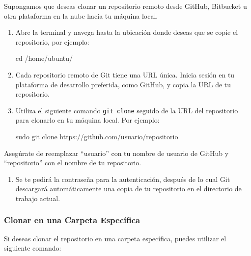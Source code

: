 \documentclass[
  letterpaper,
  DIV=11,
  numbers=noendperiod]{scrartcl}
\newenvironment{Shaded}{}{}
\newcommand{\BuiltInTok}[1]{\textcolor[rgb]{0.84,0.23,0.29}{#1}}
\newcommand{\FunctionTok}[1]{\textcolor[rgb]{0.44,0.26,0.76}{#1}}
\newcommand{\NormalTok}[1]{\textcolor[rgb]{0.14,0.16,0.18}{#1}}
\providecommand{\tightlist}{%
  \setlength{\itemsep}{0pt}\setlength{\parskip}{0pt}}\usepackage{longtable,booktabs,array}
\begin{document}
Supongamos que deseas clonar un repositorio remoto desde GitHub,
Bitbucket u otra plataforma en la nube hacia tu máquina local.

\begin{enumerate}
\def\labelenumi{\arabic{enumi}.}
\item
  Abre la terminal y navega hasta la ubicación donde deseas que se copie
  el repositorio, por ejemplo:

\begin{Shaded}
\begin{Highlighting}[]
\BuiltInTok{cd}\NormalTok{ /home/ubuntu/}
\end{Highlighting}
\end{Shaded}
\item
  Cada repositorio remoto de Git tiene una URL única. Inicia sesión en
  tu plataforma de desarrollo preferida, como GitHub, y copia la URL de
  tu repositorio.
\item
  Utiliza el siguiente comando \texttt{git\ clone} seguido de la URL del
  repositorio para clonarlo en tu máquina local. Por ejemplo:

\begin{Shaded}
\begin{Highlighting}[]
\FunctionTok{sudo}\NormalTok{ git clone https://github.com/usuario/repositorio}
\end{Highlighting}
\end{Shaded}
\end{enumerate}

Asegúrate de reemplazar ``usuario'' con tu nombre de usuario de GitHub y
``repositorio'' con el nombre de tu repositorio.

\begin{enumerate}
\def\labelenumi{\arabic{enumi}.}
\setcounter{enumi}{3}
\tightlist
\item
  Se te pedirá la contraseña para la autenticación, después de lo cual
  Git descargará automáticamente una copia de tu repositorio en el
  directorio de trabajo actual.
\end{enumerate}

\hypertarget{clonar-en-una-carpeta-especuxedfica}{%
\subsubsection{Clonar en una Carpeta
Específica}\label{clonar-en-una-carpeta-especuxedfica}}

Si deseas clonar el repositorio en una carpeta específica, puedes
utilizar el siguiente comando:
\end{document}
